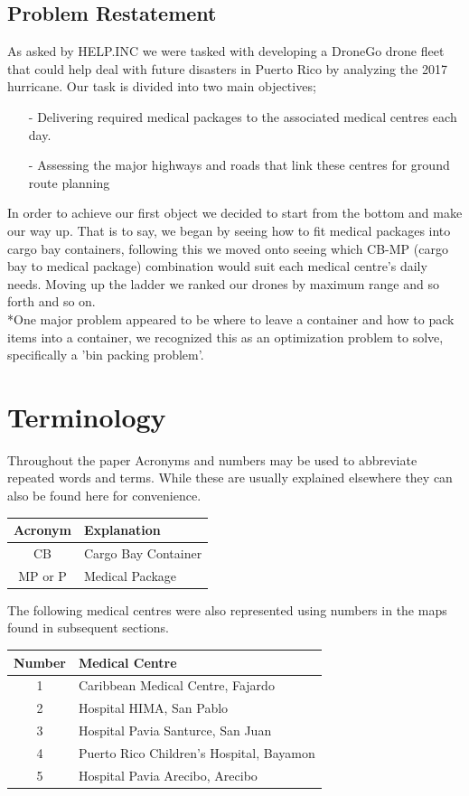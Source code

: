 \documentclass[a4paper,12pt]{article}
\begin{document}
\subsection{Problem Restatement}
As asked by HELP.INC we were tasked with developing a DroneGo drone fleet that could help deal with future disasters in
Puerto Rico by analyzing the 2017 hurricane. Our task is divided into two main objectives;
\begin{itemize}
\item[-]Delivering required medical packages to the associated medical centres each day.
\item[-]Assessing the major highways and roads that link these centres for ground route planning
\end{itemize}
In order to achieve our first object we decided to start from the bottom and make our way up. That is to say, we began by seeing how to fit medical packages into cargo bay containers, following this
we moved onto seeing which CB-MP (cargo bay to medical package) combination would suit each medical centre's daily needs. Moving up the ladder we ranked our drones by maximum range and so forth and so on.
\\*One major problem appeared to be where to leave a container and how to pack items into a container, we recognized this as an optimization problem to solve, specifically a 'bin packing problem'.

\section{Terminology}
Throughout the paper Acronyms and numbers may be used to abbreviate repeated words and terms. While these are usually explained elsewhere they can also be found here for convenience.

\begin{center}
\begin{tabular}{ |c|l| }
 \hline
 Acronym & Explanation  \\\hline
 CB & Cargo Bay Container  \\
 MP or P & Medical Package \\
 \hline
\end{tabular}
\end{center}
The following medical centres were also represented using numbers in the maps found in subsequent sections.

\begin{center}
\begin{tabular}{ |c|l| }
 \hline
 Number & Medical Centre  \\\hline
 1 & Caribbean Medical Centre, Fajardo  \\
 2 & Hospital HIMA, San Pablo \\
 3 & Hospital Pavia Santurce, San Juan \\
 4 & Puerto Rico Children's Hospital, Bayamon \\
 5 & Hospital Pavia Arecibo, Arecibo  \\
 \hline
\end{tabular}
\end{center}
\end{document}
